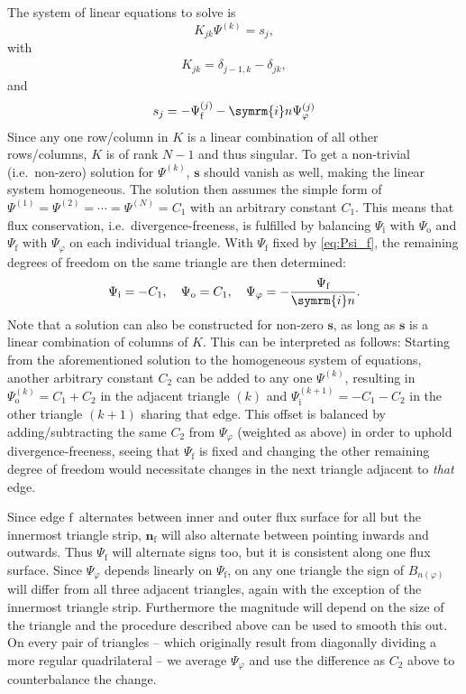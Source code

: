 \documentclass[a4paper, 10pt, english]{article}
\let\temp\varrho
\let\varrho\rho
\let\rho\temp
\let\temp\vartheta
\let\vartheta\theta
\let\theta\temp
\let\temp\varphi
\let\varphi\phi
\let\phi\temp
\let\vec\symbf
\newcommand*\im{\ensuremath{\symrm{i}}}  %
\newcommand*\fs{\ensuremath{\textrm{f}}}  %
\newcommand*\inw{\ensuremath{\textrm{i}}}  %
\newcommand*\out{\ensuremath{\textrm{o}}}  %
\begin{document}
The system of linear equations to solve is
\begin{equation}
  K_{jk} \Psi^{(k)} = s_{j},
\end{equation}
with
\begin{gather}
  K_{jk} = \delta_{j-1, k} - \delta_{jk},
\end{gather}
and
\begin{gather}
  s_{j} = -\Psi_{\fs}^{(j)} - \im n \Psi_{\phi}^{(j)}
\end{gather}
Since any one row/column in $K$ is a linear combination of all other rows/columns, $K$ is of rank $N - 1$ and thus singular. To get a non-trivial (i.e.\ non-zero) solution for $\Psi^{(k)}$, $\vec{s}$ should vanish as well, making the linear system homogeneous. The solution then assumes the simple form of $\Psi^{(1)} = \Psi^{(2)} = \dotsb = \Psi^{(N)} = C_{1}$ with an arbitrary constant $C_{1}$. This means that flux conservation, i.e.\ divergence-freeness, is fulfilled by balancing $\Psi_{\inw}$ with $\Psi_{\out}$ and $\Psi_{\fs}$ with $\Psi_{\phi}$ on each individual triangle. With $\Psi_{\fs}$ fixed by \cref{eq:Psi_f}, the remaining degrees of freedom on the same triangle are then determined:
\begin{gather}
  \Psi_{\inw} = -C_{1}, \quad \Psi_{\out} = C_{1}, \quad \Psi_{\phi} = -\frac{\Psi_{\fs}}{\im n}.
\end{gather}
Note that a solution can also be constructed for non-zero $\vec{s}$, as long as $\vec{s}$ is a linear combination of columns of $K$. This can be interpreted as follows: Starting from the aforementioned solution to the homogeneous system of equations, another arbitrary constant $C_{2}$ can be added to any one $\Psi^{(k)}$, resulting in $\Psi_{\out}^{(k)} = C_{1} + C_{2}$ in the adjacent triangle $(k)$ and $\Psi_{\inw}^{(k+1)} = -C_{1} - C_{2}$  in the other triangle $(k+1)$ sharing that edge. This offset is balanced by adding/subtracting the same $C_{2}$ from $\Psi_{\phi}$ (weighted as above) in order to uphold divergence-freeness, seeing that $\Psi_{\fs}$ is fixed and changing the other remaining degree of freedom would necessitate changes in the next triangle adjacent to \emph{that} edge.

Since edge \fs\ alternates between inner and outer flux surface for all but the innermost triangle strip, $\vec{n}_{\fs}$ will also alternate between pointing inwards and outwards. Thus $\Psi_{\fs}$ will alternate signs too, but it is consistent along one flux surface. Since $\Psi_{\phi}$ depends linearly on $\Psi_{\fs}$, on any one triangle the sign of $B_{n (\phi)}$ will differ from all three adjacent triangles, again with the exception of the innermost triangle strip. Furthermore the magnitude will depend on the size of the triangle and the procedure described above can be used to smooth this out. On every pair of triangles -- which originally result from diagonally dividing a more regular quadrilateral -- we average $\Psi_{\phi}$ and use the difference as $C_{2}$ above to counterbalance the change.
\end{document}
